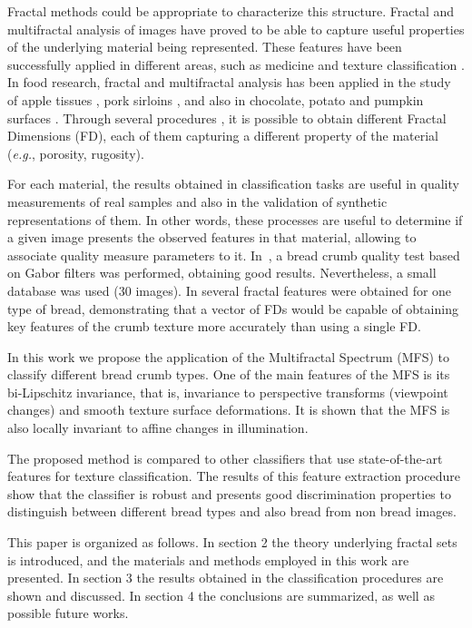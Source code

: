 \documentclass[a4paper,10pt]{article}
\begin{document}
Fractal methods could be appropriate to characterize this structure. Fractal and multifractal analysis of images have proved to be able to capture useful properties of the underlying material being represented. These features have been successfully applied in different areas, such as medicine \cite{Andjelkovic2008,Yu2011} and texture classification \cite{Wendt2009}. In food research, fractal and multifractal analysis has been applied in the study of apple tissues \cite{Mendoza2010}, pork sirloins \cite{Serrano2012}, and also in chocolate, potato and pumpkin surfaces \cite{Quevedo2002}. Through several procedures \cite{Peitgen2004, Gonzales2008}, it is possible to obtain different Fractal Dimensions (FD), each of them capturing a different property of the material ({\em e.g.}, porosity, rugosity).

For each material, the results obtained in classification tasks are useful in quality measurements of real samples and also in the validation of synthetic representations of them. In other words, these processes are useful to determine if a given image presents the observed features in that material, allowing to associate quality measure parameters to it. In~\cite{Fan2006}, a bread crumb quality test based on Gabor filters was performed, obtaining good results. Nevertheless, a small database was used ($30$ images). In \cite{Gonzales2008} several fractal features were obtained for one type of bread, demonstrating that a vector of FDs would be capable of obtaining key features of the crumb texture more accurately than using a single FD.

In this work we propose the application of the Multifractal Spectrum (MFS) \cite{Xu2006} to classify different bread crumb types. One of the main features of the MFS is its bi-Lipschitz invariance, that is, invariance to perspective transforms (viewpoint changes) and smooth texture surface deformations. It is shown that the MFS is also locally invariant to affine changes in illumination.

The proposed method is compared to other classifiers that use state-of-the-art features for texture classification. The results of this feature extraction procedure show that the classifier is robust and presents good discrimination properties to distinguish between different bread types and also bread from non bread images. 

This paper is organized as follows. In section 2 the theory underlying fractal sets is introduced, and the materials and methods employed in this work are presented. In section 3 the results obtained in the classification procedures are shown and discussed. In section 4 the conclusions are summarized, as well as possible future works.
\end{document}
